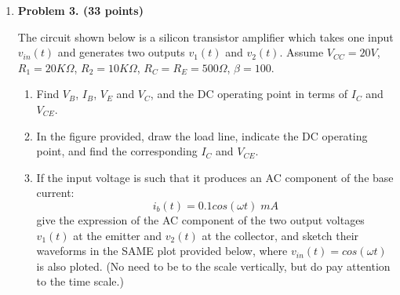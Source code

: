 \begin{enumerate}


\item {\bf Problem 3. (33 points)} 


The circuit shown below is a silicon transistor amplifier which takes one
input $v_{in}(t)$ and generates two outputs $v_1(t)$ and $v_2(t)$. Assume 
$V_{CC}=20V$, $R_1=20K\Omega$, $R_2=10K\Omega$, $R_C=R_E=500\Omega$, $\beta=100$. 

\begin{enumerate}
\item Find $V_B$, $I_B$, $V_E$ and $V_C$, and the DC operating point in 
terms of $I_C$ and $V_{CE}$. 
\item In the figure provided, draw the load line, indicate the DC operating 
point, and find the corresponding $I_C$ and $V_{CE}$.
\item If the input voltage is such that it produces an AC component of the 
base current:
\[	i_b(t)=0.1 cos(\omega t) \; mA	\]
give the expression of the AC component of the two output voltages $v_1(t)$ 
at the emitter and $v_2(t)$ at the collector, and sketch their waveforms in 
the SAME plot provided below, where $v_{in}(t)=cos(\omega t)$ is also ploted.
(No need to be to the scale vertically, but do pay attention to the time
scale.)
\end{enumerate}


\end{enumerate}
